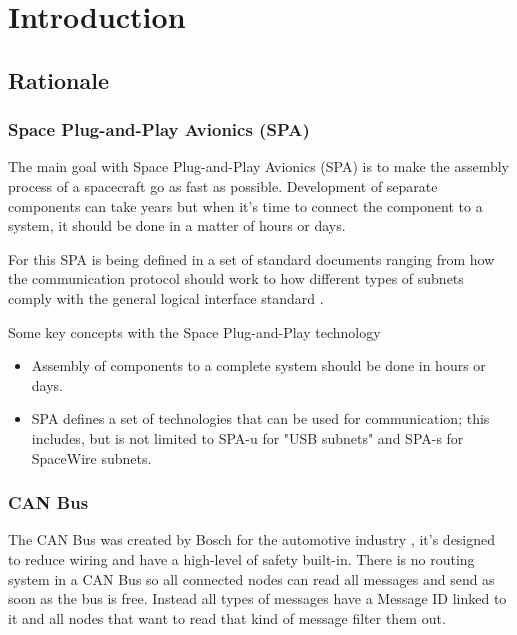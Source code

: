 \section{Introduction}
\subsection{Rationale}
\subsubsection{Space Plug-and-Play Avionics (SPA)}
The main goal with Space Plug-and-Play Avionics (SPA) is to make the
assembly process of a spacecraft go as fast as possible. Development of
separate components can take years but when it's time to connect the component
to a system, it should be done in a matter of hours or days.

For this SPA is being defined in a set of standard documents ranging from how
the communication protocol should work to how different types of subnets comply
with the general logical interface standard \cite{standard:spa_logical_interface,
    standard:spa_networking,standard:spa_spacewire_adaptation,standard:spa_physical_interface,
standard:spa_local_adaptation}.

Some key concepts with the Space Plug-and-Play technology
\begin{itemize}
    \item Assembly of components to a complete system should be done in hours or days.
    \item SPA defines a set of technologies that can be used for communication;
        this includes, but is not limited to SPA-u for "USB subnets" and SPA-s
        for SpaceWire subnets.
\end{itemize}



\subsubsection{CAN Bus}
The CAN Bus was created by Bosch for the automotive industry \cite{standard:can_bus}, it's designed to
reduce wiring and have a high-level of safety built-in. There is no routing
system in a CAN Bus so all connected nodes can read all messages and send as
soon as the bus is free. Instead all types of messages have a Message ID linked
to it and all nodes that want to read that kind of message filter them out.

